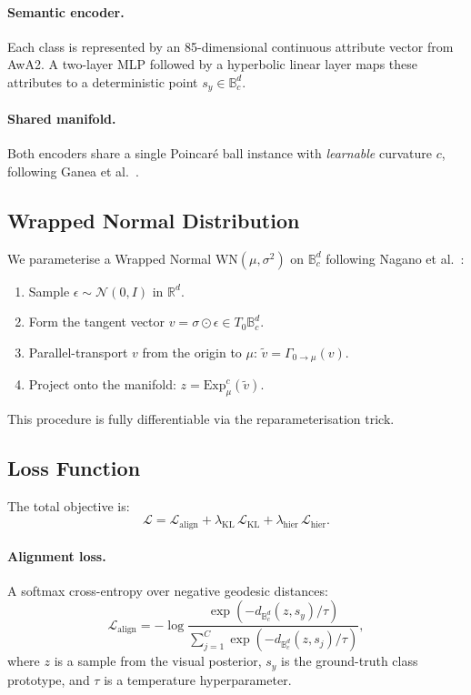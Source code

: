 \documentclass{article}
\newcommand{\R}{\mathbb{R}}
\newcommand{\WN}{\mathrm{WN}}
\newcommand{\expmap}{\mathrm{Exp}}
\newcommand{\poinc}{\mathbb{B}^{d}_{c}}
\newcommand{\dH}{d_{\poinc}}
\DeclareMathOperator{\KL}{KL}
\begin{document}
\paragraph{Semantic encoder.}
Each class is represented by an 85-dimensional continuous attribute vector from AwA2.
A two-layer MLP followed by a hyperbolic linear layer maps these attributes to a deterministic point $s_y \in \poinc$.

\paragraph{Shared manifold.}
Both encoders share a single Poincar\'{e} ball instance with \emph{learnable} curvature $c$, following Ganea et al.~\cite{ganea2018hyperbolic}.

\subsection{Wrapped Normal Distribution}\label{sec:wrapped}

We parameterise a Wrapped Normal $\WN(\mu, \sigma^2)$ on $\poinc$ following Nagano et al.~\cite{nagano2019wrapped}:
\begin{enumerate}
    \item Sample $\epsilon \sim \mathcal{N}(0, I)$ in $\R^d$.
    \item Form the tangent vector $v = \sigma \odot \epsilon \in T_0\poinc$.
    \item Parallel-transport $v$ from the origin to $\mu$: $\tilde{v} = \Gamma_{0 \to \mu}(v)$.
    \item Project onto the manifold: $z = \expmap_\mu^c(\tilde{v})$.
\end{enumerate}
This procedure is fully differentiable via the reparameterisation trick.

\subsection{Loss Function}\label{sec:loss}

The total objective is:
\begin{equation}
    \mathcal{L} = \mathcal{L}_{\mathrm{align}} + \lambda_{\KL}\,\mathcal{L}_{\KL} + \lambda_{\mathrm{hier}}\,\mathcal{L}_{\mathrm{hier}}.
\end{equation}

\paragraph{Alignment loss.}
A softmax cross-entropy over negative geodesic distances:
\begin{equation}
    \mathcal{L}_{\mathrm{align}} = -\log \frac{\exp\!\left(-\dH(z, s_y) / \tau\right)}{\sum_{j=1}^{C} \exp\!\left(-\dH(z, s_j) / \tau\right)},
\end{equation}
where $z$ is a sample from the visual posterior, $s_y$ is the ground-truth class prototype, and $\tau$ is a temperature hyperparameter.
\end{document}
